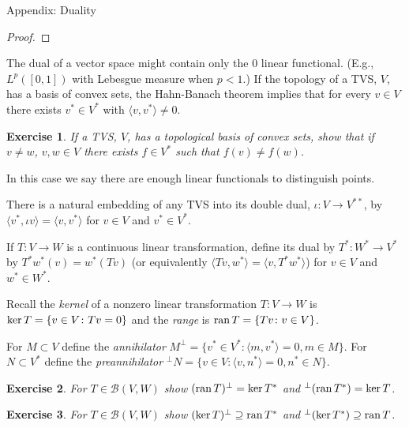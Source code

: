 \documentclass[fleqn]{amsart}
\def\ker{\mathop{\rm ker}}
\def\ran{\mathop{\rm ran}}
\newcommand{\B}{\mathcal{B}}
\newtheorem{exercise}{Exercise}
\begin{document}
\begin{section}{Appendix: Duality}
\begin{proof}
\end{proof}
The dual of a vector space might contain only the 0 linear functional.
(E.g., $L^p([0,1])$ with Lebesgue measure when $p < 1$.) If the topology
of a TVS, $V$, has a basis of convex sets, the Hahn-Banach theorem
implies that for every $v\in V$ there exists $v^*\in V^*$ with $\langle v,
v^*\rangle \not=0$.

\begin{exercise}
If a TVS, $V$, has a topological basis of convex sets,
show that if $v\not=w$, $v,w\in V$ there exists $f\in V^*$
such that $f(v)\not= f(w)$.
\end{exercise}

In this case we say there are enough linear functionals to
distinguish points.

There is a natural embedding of any TVS into its double dual,
$\iota\colon V\to V^{**}$, by $\langle v^*,\iota v\rangle
= \langle v, v^*\rangle$ for $v\in V$ and $v^*\in V^*$.

If $T\colon V\to W$ is a continuous linear transformation, define its
dual by $T^*\colon W^*\to V^*$ by $T^*w^*(v) = w^*(Tv)$ (or equivalently
$\langle Tv, w^*\rangle = \langle v, T^*w^*\rangle$) for $v\in V$ and
$w^*\in W^*$.

Recall the {\em kernel} of a nonzero linear transformation $T\colon V\to
W$ is $\ker T = \{v\in V\colon Tv = 0\}$ and the {\em range} is $\ran T =
\{Tv\colon v\in V\}$.

For $M\subset V$ define the {\em annihilator} $M^\perp = \{v^*\in
V^*\colon \langle m, v^*\rangle = 0, m\in M\}$. For $N\subset V^*$
define the {\em preannihilator} $^\perp N = \{v\in V\colon \langle v,
n^*\rangle = 0, n^*\in N\}$.

\begin{exercise}
For $T\in\B(V,W)$ show $(\ran T)^\perp = \ker T^*$ and $^\perp(\ran T^*)
= \ker T$.
\end{exercise}

\begin{exercise}
For $T\in\B(V,W)$ show $(\ker T)^\perp \supseteq \ran T^*$ and
$^\perp(\ker T^*)\supseteq \ran T$.

\end{exercise}

\end{section}
\end{document}
